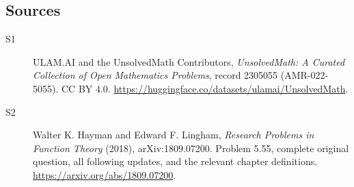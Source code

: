 \documentclass[11pt]{book}
\begin{document}
\subsection{Sources}
\begin{description}
\item[\hypertarget{source:2305055:1}{S1}] ULAM.AI and the UnsolvedMath Contributors, \emph{UnsolvedMath: A Curated Collection of Open Mathematics Problems}, record 2305055 (AMR-022-5055). CC BY 4.0. \url{https://huggingface.co/datasets/ulamai/UnsolvedMath}.
\item[\hypertarget{source:2305055:2}{S2}] Walter K. Hayman and Edward F. Lingham, \emph{Research Problems in Function Theory} (2018), arXiv:1809.07200. Problem 5.55, complete original question, all following updates, and the relevant chapter definitions. \url{https://arxiv.org/abs/1809.07200}.
\end{description}
\label{end:2305055}
\end{document}
